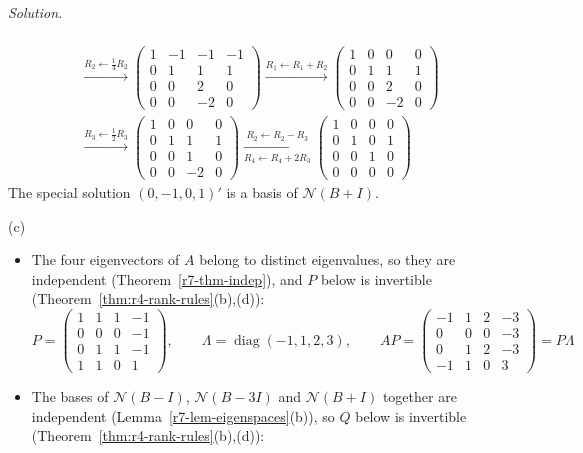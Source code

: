 \documentclass[12pt]{article}
\DeclareMathOperator{\diag}{diag}
\theoremstyle{definition}
\newenvironment{solution}{\par\noindent\textit{Solution.}\ }{\par\smallskip}
\begin{document}
\begin{solution}
\begin{itemize}
\[\begin{gathered}
\\
\xrightarrow{R_2\leftarrow\frac14R_2}
\begin{pmatrix}1&-1&-1&-1\\0&1&1&1\\0&0&2&0\\0&0&-2&0\end{pmatrix}
\xrightarrow{R_1\leftarrow R_1+R_2}
\begin{pmatrix}1&0&0&0\\0&1&1&1\\0&0&2&0\\0&0&-2&0\end{pmatrix}
\\
\xrightarrow{R_3\leftarrow\frac12R_3}
\begin{pmatrix}1&0&0&0\\0&1&1&1\\0&0&1&0\\0&0&-2&0\end{pmatrix}
\xrightarrow[R_4\leftarrow R_4+2R_3]{R_2\leftarrow R_2-R_3}
\begin{pmatrix}1&0&0&0\\0&1&0&1\\0&0&1&0\\0&0&0&0\end{pmatrix}
\end{gathered}
\]
The special solution \((0,-1,0,1)'\) is a basis of \(\mathcal N(B+I)\).
\end{itemize}
(c)
\begin{itemize}
\item The four eigenvectors of \(A\) belong to distinct eigenvalues, so they are independent
(Theorem~\ref{r7-thm-indep}), and \(P\) below is invertible (Theorem~\ref{thm:r4-rank-rules}(b),(d)):
\[
P=\begin{pmatrix}1&1&1&-1\\0&0&0&-1\\0&1&1&-1\\1&1&0&1\end{pmatrix},\qquad\Lambda=\diag(-1,1,2,3),\qquad
AP=\begin{pmatrix}-1&1&2&-3\\0&0&0&-3\\0&1&2&-3\\-1&1&0&3\end{pmatrix}=P\Lambda
\]
\item The bases of \(\mathcal N(B-I)\), \(\mathcal N(B-3I)\) and \(\mathcal N(B+I)\) together are independent
(Lemma~\ref{r7-lem-eigenspaces}(b)), so \(Q\) below is invertible (Theorem~\ref{thm:r4-rank-rules}(b),(d)):

\end{itemize}
\end{solution}
\end{document}
